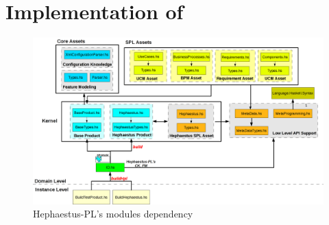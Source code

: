 \section{Implementation of \hpl}
\label{sec:implementation}


\begin{figure}[bth]
\begin{center}
\includegraphics[scale=0.35]{imagens/modules-hpl.png}
\end{center}
\caption{Hephaestus-PL's modules dependency}
\label{fig:modules-hpl}
\end{figure}






